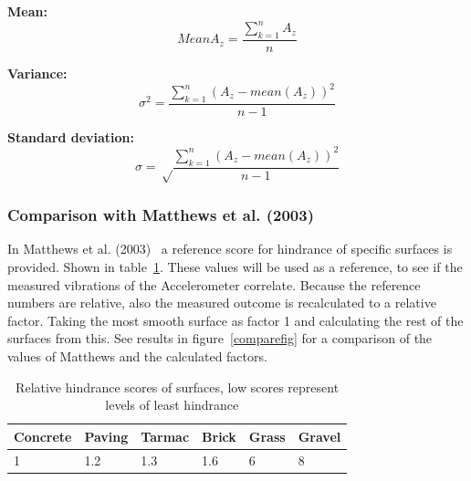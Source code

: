\textbf{Mean:}  
\begin{equation}
Mean A_{z} = \frac{\sum_{k=1}^n A_{z}}{n}
\end{equation}

\textbf{Variance:}
\begin{equation}
\sigma^2 = \frac{\sum_{k=1}^n (A_{z}- mean(A_{z}))^2}{n-1}
\end{equation}

\textbf{Standard deviation:}
\begin{equation}
\sigma = \sqrt \frac{\sum_{k=1}^n (A_{z}- mean(A_{z}))^2}{n-1}
\end{equation}

\subsubsection{Comparison with Matthews et al. (2003)}
In Matthews et al. (2003)~\cite{Matthews2003} a reference score for hindrance of specific surfaces is provided. Shown in table~\ref{hindrance}. These values will be used as a reference, to see if the measured vibrations of the Accelerometer correlate. Because the reference numbers are relative, also the measured outcome is recalculated to a relative factor. Taking the most smooth surface as factor 1 and calculating the rest of the surfaces from this. See results in figure~\ref{comparefig} for a comparison of the values of Matthews and the calculated factors. 

\begin{table}[h]
\caption[Relative hindrance scores of surfaces]{Relative hindrance scores of surfaces, low scores represent levels of least hindrance ~\cite{Matthews2003} \label{hindrance}}
\centering
\begin{tabular}{|l|l|l|l|l|l|}
	\hline
	Concrete & Paving & Tarmac & Brick & Grass & Gravel\\
	\hline
	1 & 1.2 & 1.3 & 1.6 & 6 & 8 \\
	\hline
\end{tabular}
\end{table}